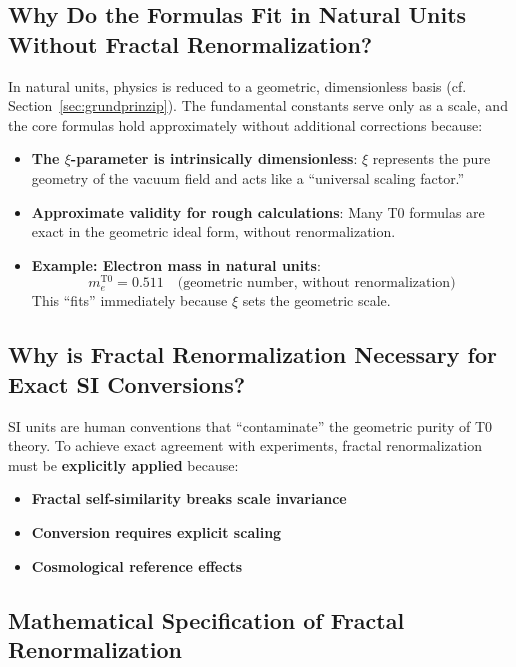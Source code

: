 \documentclass[12pt,a4paper]{article}
\begin{document}
	\subsection{Why Do the Formulas Fit in Natural Units Without Fractal Renormalization?}
	
	In natural units, physics is reduced to a geometric, dimensionless basis (cf. Section~\ref{sec:grundprinzip}). The fundamental constants serve only as a scale, and the core formulas hold approximately without additional corrections because:
	
	\begin{itemize}
		\item \textbf{The $\xi$-parameter is intrinsically dimensionless}: $\xi$ represents the pure geometry of the vacuum field and acts like a ``universal scaling factor.''
		
		\item \textbf{Approximate validity for rough calculations}: Many T0 formulas are exact in the geometric ideal form, without renormalization.
		
		\item \textbf{Example: Electron mass in natural units}:
		\begin{equation}
			m_e^{\mathrm{T0}} = 0.511 \quad \text{(geometric number, without renormalization)}
		\end{equation}
		This ``fits'' immediately because $\xi$ sets the geometric scale.
	\end{itemize}
	
	\subsection{Why is Fractal Renormalization Necessary for Exact SI Conversions?}
	
	SI units are human conventions that ``contaminate'' the geometric purity of T0 theory. To achieve exact agreement with experiments, fractal renormalization must be \textbf{explicitly applied} because:
	
	\begin{itemize}
		\item \textbf{Fractal self-similarity breaks scale invariance}
		\item \textbf{Conversion requires explicit scaling}
		\item \textbf{Cosmological reference effects}
	\end{itemize}
	
	\subsection{Mathematical Specification of Fractal Renormalization}
	
\end{document}
